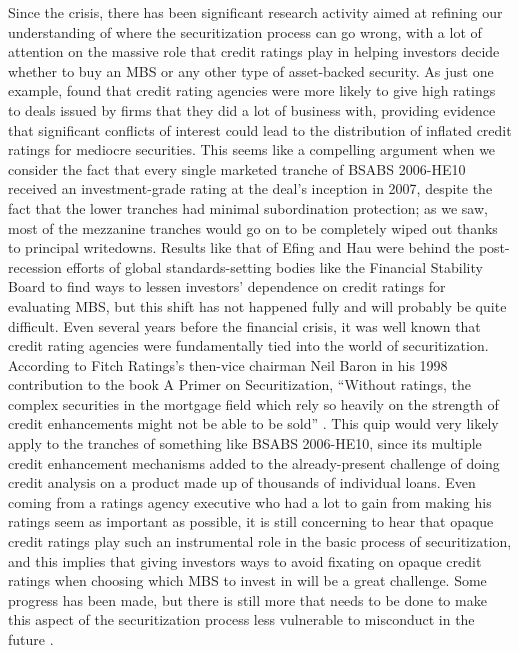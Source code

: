 \documentclass[12pt]{article}
\begin{document}
Since the crisis, there has been significant research activity aimed at refining our understanding of where the securitization process can go wrong, with a lot of attention on the massive role that credit ratings play in helping investors decide whether to buy an MBS or any other type of asset-backed security. As just one example, \textcite{efing14} found that credit rating agencies were more likely to give high ratings to deals issued by firms that they did a lot of business with, providing evidence that significant conflicts of interest could lead to the distribution of inflated credit ratings for mediocre securities. This seems like a compelling argument when we consider the fact that every single marketed tranche of BSABS 2006-HE10 received an investment-grade rating at the deal’s inception in 2007, despite the fact that the lower tranches had minimal subordination protection; as we saw, most of the mezzanine tranches would go on to be completely wiped out thanks to principal writedowns. Results like that of Efing and Hau were behind the post-recession efforts of global standards-setting bodies like the Financial Stability Board to find ways to lessen investors’ dependence on credit ratings for evaluating MBS, but this shift has not happened fully and will probably be quite difficult. Even several years before the financial crisis, it was well known that credit rating agencies were fundamentally tied into the world of securitization. According to Fitch Ratings’s then-vice chairman Neil Baron in his 1998 contribution to the book A Primer on Securitization, “Without ratings, the complex securities in the mortgage field which rely so heavily on the strength of credit enhancements might not be able to be sold” \parencite{baron98}. This quip would very likely apply to the tranches of something like BSABS 2006-HE10, since its multiple credit enhancement mechanisms added to the already-present challenge of doing credit analysis on a product made up of thousands of individual loans. Even coming from a ratings agency executive who had a lot to gain from making his ratings seem as important as possible, it is still concerning to hear that opaque credit ratings play such an instrumental role in the basic process of securitization, and this implies that giving investors ways to avoid fixating on opaque credit ratings when choosing which MBS to invest in will be a great challenge. Some progress has been made, but there is still more that needs to be done to make this aspect of the securitization process less vulnerable to misconduct in the future \parencite{scheicher17}.
\end{document}
